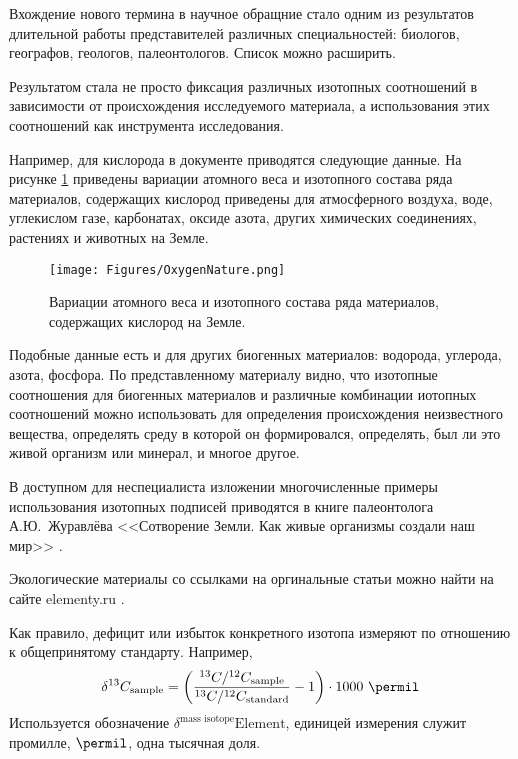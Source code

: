 \documentclass[a5paper,openany]{book}
\begin{document}
Вхождение нового термина в научное обращние стало одним из результатов длительной работы представителей различных специальностей: биологов, географов, геологов, палеонтологов. Список можно расширить.

Результатом стала не просто фиксация различных изотопных соотношений в зависимости от происхождения исследуемого материала, а использования этих соотношений как инструмента исследования.

Например, для кислорода в документе \cite{IUPAC2018} приводятся следующие данные.
На рисунке \ref{f:OxygenNature} приведены вариации атомного веса и изотопного состава ряда материалов, содержащих кислород приведены для атмосферного воздуха, воде, углекислом газе, карбонатах, оксиде азота, других химических соединениях, растениях и животных на Земле. 

\begin{figure}[ht] 
	\centering\small
	\unitlength=1mm
	\texttt{[image: Figures/OxygenNature.png]} 
	\caption{Вариации атомного веса и изотопного состава ряда материалов, содержащих кислород \cite{IUPAC2018} на Земле.} 
	\label{f:OxygenNature}
\end{figure}


Подобные данные есть и для других биогенных материалов: водорода, углерода, азота, фосфора. 
По представленному материалу видно, что изотопные соотношения для биогенных материалов и различные комбинации  иотопных соотношений можно использовать для определения происхождения неизвестного вещества, определять среду в которой он формировался, определять, был ли это живой организм или минерал, и многое другое. 

В доступном для неспециалиста изложении многочисленные примеры использования изотопных подписей приводятся в книге палеонтолога А.Ю.~Журавлёва <<Сотворение Земли. Как живые организмы создали наш мир>> \cite{Zhuravlev2019}.

Экологические материалы со ссылками на оргинальные статьи можно найти на сайте elementy.ru \cite{OpaevIsotope}.

Как правило, дефицит или избыток конкретного изотопа измеряют по отношению к общепринятому стандарту. Например,
\begin{equation*}
	\delta^{13}C_{\text{sample}} = \left( \frac{^{13}C/^{12}C_{\text{sample}}}{^{13}C/^{12}C_{\text{standard}}} - 1\right) \cdot 1000 \ \permil
\end{equation*}
Используется обозначение $\delta^{\text{mass isotope}}\text{Element}$, единицей измерения служит промилле, $\permil$, одна тысячная доля.
\end{document}
